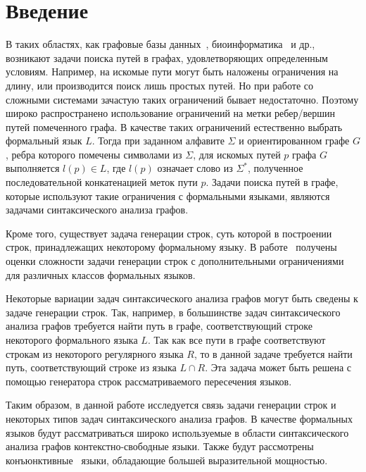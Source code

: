 \section*{Введение}

В таких областях, как графовые базы данных~\cite{azimov-spbu-graphDB}, биоинформатика~\cite{azimov-spbu-Anderson} и др., возникают задачи поиска путей в графах, удовлетворяющих определенным условиям. Например, на искомые пути могут быть наложены ограничения на длину, или производится поиск лишь простых путей. Но при работе со сложными системами зачастую таких ограничений бывает недостаточно. Поэтому широко распространено использование ограничений на метки ребер/вершин путей помеченного графа. В качестве таких ограничений естественно выбрать формальный язык $L$. Тогда при заданном алфавите $\Sigma$ и ориентированном графе $G$, ребра которого помечены символами из $\Sigma$, для искомых путей $p$ графа $G$ выполняется $l(p) \in L$, где $l(p)$ означает слово из $\Sigma^*$, полученное последовательной конкатенацией меток пути $p$. Задачи поиска путей в графе, которые используют такие ограничения с формальными языками, являются задачами синтаксического анализа графов.

Кроме того, существует задача генерации строк, суть которой в построении строк, принадлежащих некоторому формальному языку. В работе~\cite{azimov-spbu-Okhotin} получены оценки сложности задачи генерации строк с дополнительными ограничениями для различных классов формальных языков.

Некоторые вариации задач синтаксического анализа графов могут быть сведены к задаче генерации строк. Так, например, в большинстве задач синтаксического анализа графов требуется найти путь в графе, соответствующий строке некоторого формального языка $L$. Так как все пути в графе соответствуют строкам из некоторого регулярного языка $R$, то в данной задаче требуется найти путь, соответствующий строке из языка $L \cap R$. Эта задача может быть решена с помощью генератора строк рассматриваемого пересечения языков.

Таким образом, в данной работе исследуется связь задачи генерации строк и некоторых типов задач синтаксического анализа графов. В качестве формальных языков будут рассматриваться широко используемые в области синтаксического анализа графов контекстно-свободные языки. Также будут рассмотрены конъюнктивные~\cite{azimov-spbu-conjunctiveGrammar} языки, обладающие большей выразительной мощностью.
